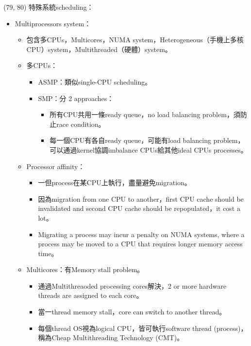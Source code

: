 \item \begin{theorem}{(79, 80)} 特殊系統scheduling：\begin{itemize}
        \item Multiprocessors system：\begin{itemize}
            \item 包含多CPUs，Multicores，NUMA system，Heterogeneous（手機上多核CPU）system，Multithreaded（硬體）system。
            \item 多CPUs：\begin{itemize}
                \item ASMP：類似single-CPU scheduling。
                \item SMP：分 2 approaches：\begin{itemize}
                    \item 所有CPU共用一條ready queue，no load balancing problem，須防止race condition。
                    \item 每一個CPU有各自ready queue，可能有load balancing problem，可以通過kernel協調imbalance CPUs給其他ideal CPUs processes。
                \end{itemize}
            \end{itemize}
            \item Processor affinity：\begin{itemize}
                \item 一但process在某CPU上執行，盡量避免migration。
                \item 因為migration from one CPU to another，first CPU cache should be invalidated and second CPU cache should be repopulated，it cost a lot。
                \item Migrating a process may incur a penalty on NUMA systems, where a process may be moved to a CPU that requires longer memory access time。
            \end{itemize}
            \item Multicores：有Memory stall problem。\begin{itemize}
                \item 通過Multithreaoded processing cores解決，2 or more hardware threads are assigned to each core。
                \item 當一thread memory stall，core can switch to another thread。
                \item 每個thread OS視為logical CPU，皆可執行software thread (process)，稱為Cheap Multithreading Technology (CMT)。

\end{itemize}
\end{itemize}
\end{itemize}
\end{theorem}
